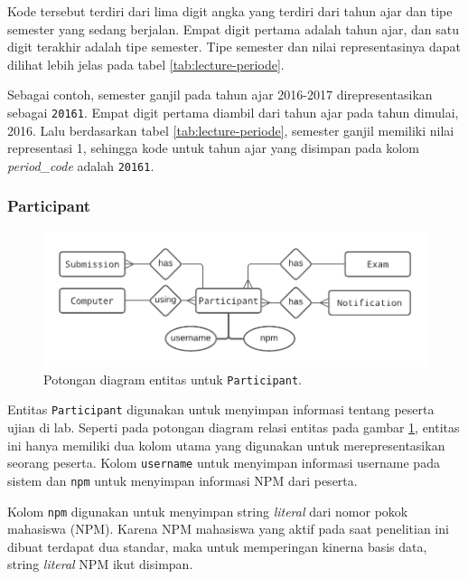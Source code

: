    Kode tersebut terdiri dari lima digit angka yang terdiri dari tahun ajar dan
    tipe semester yang sedang berjalan. Empat digit pertama adalah tahun ajar,
    dan satu digit terakhir adalah tipe semester. Tipe semester dan nilai
    representasinya dapat dilihat lebih jelas pada tabel
    \ref{tab:lecture-periode}.
    
    Sebagai contoh, semester ganjil pada tahun ajar 2016-2017 direpresentasikan
    sebagai \texttt{20161}. Empat digit pertama diambil dari tahun ajar pada
    tahun dimulai, 2016. Lalu berdasarkan tabel \ref{tab:lecture-periode},
    semester ganjil memiliki nilai representasi 1, sehingga kode untuk tahun
    ajar yang disimpan pada kolom \textit{period\_code} adalah \texttt{20161}.
    
\subsubsection{Participant}
    \begin{figure}
        \centering
        \includegraphics{Gambar/erd-details/ERD--New - Participant.pdf}
        \caption{Potongan diagram entitas untuk \texttt{Participant}.}
        \label{fig:erd_participant}
    \end{figure}
    
    Entitas \texttt{Participant} digunakan untuk menyimpan informasi tentang
    peserta ujian di lab. Seperti pada potongan diagram relasi entitas pada
    gambar \ref{fig:erd_participant}, entitas ini hanya memiliki dua kolom utama
    yang digunakan untuk merepresentasikan seorang peserta. Kolom
    \texttt{username} untuk menyimpan informasi username pada sistem dan
    \texttt{npm} untuk menyimpan informasi NPM dari peserta.
    
    Kolom \texttt{npm} digunakan untuk menyimpan string \textit{literal} dari
    nomor pokok mahasiswa (NPM). Karena NPM mahasiswa yang aktif pada saat
    penelitian ini dibuat terdapat dua standar, maka untuk memperingan kinerna
    basis data, string \textit{literal} NPM ikut disimpan.
    
